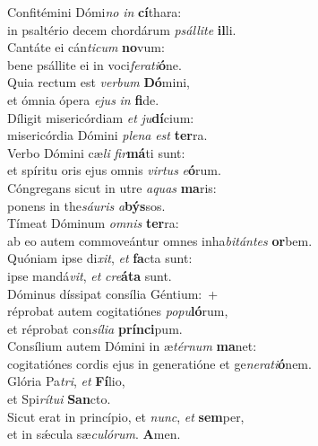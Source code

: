\evenverse Confitémini Dómi\textit{no} \textit{in} \textbf{cí}thara:~\*\\
\evenverse in psaltério decem chordárum \textit{psál}\textit{li}\textit{te} \textbf{il}li.\\
\oddverse Cantáte ei cán\textit{ti}\textit{cum} \textbf{no}vum:~\*\\
\oddverse bene psállite ei in voci\textit{fe}\textit{ra}\textit{ti}\textbf{ó}ne.\\
\evenverse Quia rectum est \textit{ver}\textit{bum} \textbf{Dó}mini,~\*\\
\evenverse et ómnia ópera \textit{e}\textit{jus} \textit{in} \textbf{fi}de.\\
\oddverse Díligit misericórdiam \textit{et} \textit{ju}\textbf{dí}cium:~\*\\
\oddverse misericórdia Dómini \textit{ple}\textit{na} \textit{est} \textbf{ter}ra.\\
\evenverse Verbo Dómini cæ\textit{li} \textit{fir}\textbf{má}ti sunt:~\*\\
\evenverse et spíritu oris ejus omnis \textit{vir}\textit{tus} \textit{e}\textbf{ó}rum.\\
\oddverse Cóngregans sicut in utre \textit{a}\textit{quas} \textbf{ma}ris:~\*\\
\oddverse ponens in the\textit{sáu}\textit{ris} \textit{a}\textbf{býs}sos.\\
\evenverse Tímeat Dóminum \textit{om}\textit{nis} \textbf{ter}ra:~\*\\
\evenverse ab eo autem commoveántur omnes inha\textit{bi}\textit{tán}\textit{tes} \textbf{or}bem.\\
\oddverse Quóniam ipse di\textit{xit}, \textit{et} \textbf{fa}cta sunt:~\*\\
\oddverse ipse mandá\textit{vit}, \textit{et} \textit{cre}\textbf{á}\textbf{ta} sunt.\\
\evenverse Dóminus díssipat consília Géntium:~+\\
\evenverse  réprobat autem cogitatiónes \textit{po}\textit{pu}\textbf{ló}rum,~\*\\
\evenverse et réprobat con\textit{sí}\textit{li}\textit{a} \textbf{prín}\textbf{ci}pum.\\
\oddverse Consílium autem Dómini in æ\textit{tér}\textit{num} \textbf{ma}net:~\*\\
\oddverse cogitatiónes cordis ejus in generatióne et ge\textit{ne}\textit{ra}\textit{ti}\textbf{ó}nem.\\
\evenverse Glória Pa\textit{tri}, \textit{et} \textbf{Fí}lio,~\*\\
\evenverse et Spi\textit{rí}\textit{tu}\textit{i} \textbf{San}cto.\\
\oddverse Sicut erat in princípio, et \textit{nunc}, \textit{et} \textbf{sem}per,~\*\\
\oddverse et in sǽcula sæ\textit{cu}\textit{ló}\textit{rum}. \textbf{A}men.\\
